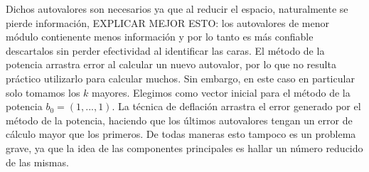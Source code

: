 Dichos autovalores son necesarios ya que al reducir el espacio, naturalmente se pierde información, EXPLICAR MEJOR ESTO: los autovalores de menor 
módulo 
contienente menos información y por lo tanto es más confiable descartalos sin perder efectividad al identificar las caras.
\newline
El método de la potencia arrastra error al calcular un nuevo autovalor, por lo que no resulta práctico utilizarlo para calcular muchos. Sin embargo,
en este caso en particular solo tomamos los $k$ mayores.
\newline
Elegimos como vector inicial para el método de la potencia $b_0 = (1,...,1)$. 
La técnica de deflación arrastra el error generado por el método de la potencia, haciendo que los últimos autovalores tengan un error de cálculo 
mayor  que los primeros. De todas maneras esto tampoco es un problema grave, ya que la idea de las componentes principales es hallar un número reducido de las mismas.





